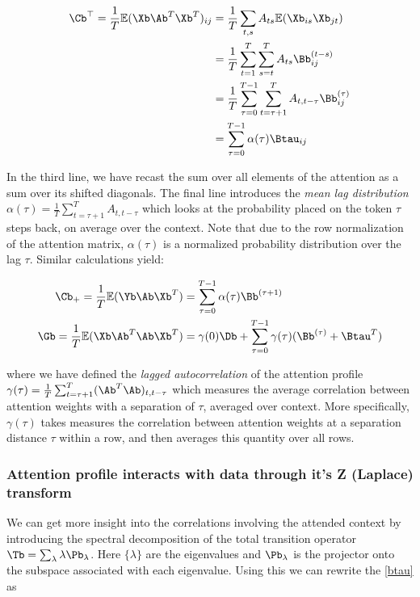 \documentclass{article}
\begin{document}
\begin{align}
    \Cb^\top = \frac{1}{T}\mathbb{E}(\Xb \Ab^T\Xb^T)_{ij} &= \frac{1}{T}\sum_{t,s} A_{ts}\mathbb{E}(\Xb_{is}\Xb_{jt}) \\
    &= \frac{1}{T}\sum_{t=1}^T\sum_{s=t}^T A_{ts} \Bb^{(t-s)}_{ij}\\
    &= \frac{1}{T}\sum_{\tau=0}^{T-1}\sum_{t = \tau+1}^T A_{t, t-\tau} \Bb^{(\tau)}_{ij} \\
 &= \sum_{\tau=0}^{T-1} \alpha(\tau) \Btau_{ij} \label{XAX}
\end{align}

In the third line, we have recast the sum over all elements of the attention as a sum over its shifted diagonals. The final line introduces the \textit{mean lag distribution} $\alpha(\tau) = \frac{1}{T}\sum_{t = \tau+1}^T A_{t,t-\tau}$ which looks at the probability placed on the token $\tau$ steps back, on average over the context. Note that due to the row normalization of the attention matrix, $\alpha(\tau)$ is a normalized probability distribution over the lag $\tau$. Similar calculations yield:



\begin{align}
    \Cb_{+} = \frac{1}{T}\mathbb{E}(\Yb \Ab \Xb^T) &= \sum_{\tau=0}^{T-1} \alpha(\tau) \Bb^{(\tau+1)} \label{YAX}\\
    \Gb = \frac{1}{T}\mathbb{E}(\Xb \Ab^T \Ab \Xb^T) &= \gamma(0) \Db + \sum_{\tau=0}^{T-1} \gamma(\tau) (\Bb^{(\tau)} + {\Btau}^T) \label{XAAX}
\end{align}

where we have defined the \textit{lagged autocorrelation} of the attention profile $\gamma(\tau) = \frac{1}{T}\sum_{t=\tau+1}^T(\Ab^T\Ab)_{t, t-\tau}$ which measures the average correlation between attention weights with a separation of $\tau$, averaged over context. More specifically, $\gamma(\tau)$ takes measures the correlation between attention weights at a separation distance $\tau$ within a row, and then averages this quantity over all rows. 

\subsubsection{Attention profile interacts with data through it's Z (Laplace) transform}
We can get more insight into the correlations involving the attended context by introducing the spectral decomposition of the total transition operator $\Tb = \sum_{\lambda} \lambda \Pb_{\lambda}$. Here $\{\lambda\}$ are the eigenvalues and $\Pb_\lambda$ is the projector onto the subspace associated with each eigenvalue. Using this we can rewrite the \eqref{btau} as 
\end{document}
